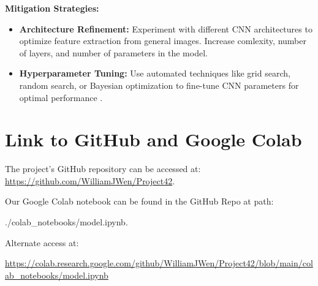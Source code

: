 \documentclass{article} %
\begin{document}
\textbf{Mitigation Strategies:}
\begin{itemize}
    \item \textbf{Architecture Refinement:} Experiment with different CNN architectures to optimize feature extraction from general images. Increase comlexity, number of layers, and number of parameters in the model.
    \item \textbf{Hyperparameter Tuning:} Use automated techniques like grid search, random search, or Bayesian optimization to fine-tune CNN parameters for optimal performance \citep{NIPS2011_86e8f7ab}.
\end{itemize}

\section{Link to GitHub and Google Colab}

The project's GitHub repository can be accessed at:  
\href{https://github.com/WilliamJWen/Project42}{https://github.com/WilliamJWen/Project42}.

Our Google Colab notebook can be found in the GitHub Repo at path:

./colab\_notebooks/model.ipynb. 

Alternate access at:

\href{https://colab.research.google.com/github/WilliamJWen/Project42/blob/main/colab_notebooks/model.ipynb} {https://colab.research.google.com/github/WilliamJWen/Project42/blob/main/colab\_notebooks/model.ipynb}

\label{last_page}



\end{document}
